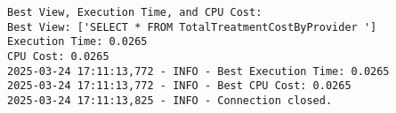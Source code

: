 \begin{lstlisting}[style=pythonstyle, caption={Output from python code }, label={lst:pso_fullOutput}]
Best View, Execution Time, and CPU Cost:
Best View: ['SELECT * FROM TotalTreatmentCostByProvider ']
Execution Time: 0.0265
CPU Cost: 0.0265
2025-03-24 17:11:13,772 - INFO - Best Execution Time: 0.0265
2025-03-24 17:11:13,772 - INFO - Best CPU Cost: 0.0265
2025-03-24 17:11:13,825 - INFO - Connection closed.

\end{lstlisting}